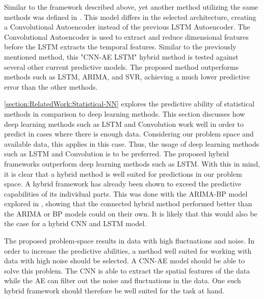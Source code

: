 Similar to the framework described above, yet another method utilizing the same methods was defined in \cite{Zaho2019}.
This model differs in the selected architecture, creating a Convolutional Autoencoder instead of the previous LSTM Autoencoder.
The Convolutional Autoencoder is used to extract and reduce dimensional features before the LSTM extracts the temporal features.
Similar to the previously mentioned method, this "CNN-AE LSTM" hybrid method is tested against several other current predictive models.
The proposed method outperforms methods such as LSTM, ARIMA, and SVR, achieving a much lower predictive error than the other methods.


\ref{section:RelatedWork:Statistical-NN} explores the predictive ability of statistical methods in comparison to deep learning methods.
This section discusses how deep learning methods such as LSTM and Convolution work well in order to predict in cases where there is enough data.
Considering our problem space and available data, this applies in this case.
Thus, the usage of deep learning methods such as LSTM and Convolution is to be preferred.
The proposed hybrid frameworks outperform deep learning methods such as LSTM.
With this in mind, it is clear that a hybrid method is well suited for predictions in our problem space.
A hybrid framework has already been shown to exceed the predictive capabilities of its individual parts.
This was done with the ARIMA-BP model explored in \cite{Bowen2020}, showing that the connected hybrid method performed better than the ARIMA or BP models could on their own.
It is likely that this would also be the case for a hybrid CNN and LSTM model.

The proposed problem-space results in data with high fluctuations and noise.
In order to increase the predictive abilities, a method well suited for working with data with high noise should be selected.
A CNN-AE model should be able to solve this problem.
The CNN is able to extract the spatial features of the data while the AE can filter out the noise and fluctuations in the data.
One such hybrid framework should therefore be well suited for the task at hand.


